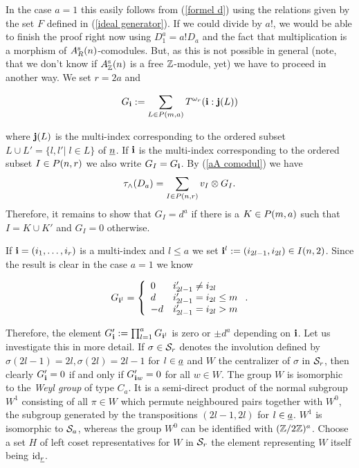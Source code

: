 \documentclass[twoside,12pt]{article}
\begin{document}
\begin{Pf}
In the case $a=1$ this easily follows from (\ref{formel d}) using the
relations given by the set $F$ defined in (\ref{ideal generator}). If we could divide by
$a!$, we would be able to finish the proof right now using
$D_1^a=a!D_a$ and the fact that multiplication is a morphism of
$A^{{\rm s}}_{R}(n)$-comodules. But, as this is not possible in general (note,
that we don't know if $A^{{\rm s}}_{{\mathbb Z}}(n)$ is a free ${\mathbb Z}$-module, yet)
we have to proceed in another way. We set $r=2a$ and

\[ G_{{\bf i}}:=\sum_{L\in P({m},{a})}T^{\omega_r}({\bf i}:{\bf j}(L))
\]

where ${\bf j}(L)$ is the multi-index corresponding to the ordered
subset $L\cup L'=\{l,l'|\; l\in L\}$ of $\underline{n}$. If ${\bf i}$ is the
multi-index corresponding to the ordered subset $I\in P({n},{r})$ we also
write $G_I=G_{{\bf i}}$. By (\ref{aA comodul})
we have
\[ \tau_{\wedge}(D_a)=\sum_{I\in P({n},{r})}v_{I}\otimes G_I. \]
Therefore, it remains to show that $G_I=d^a$ if there is a $K\in P({m},{a})$
such that $I=K\cup K'$ and $G_I=0$ otherwise.\Ab

If ${\bf i}=(i_1,\ldots , i_r)$ is a
multi-index and $l\leq a$ we set ${\bf i}^l:=(i_{2l-1},i_{2l})\in
I(n,2)$. Since the result is clear in the case $a=1$ we know

\[
G_{{\bf i}^l}=\left\{\begin{array}{ll}
0 & i_{2l-1}'\neq i_{2l} \\
d &  i_{2l-1}'= i_{2l}\leq m\\
-d &  i_{2l-1}'= i_{2l}> m
\end{array} \right. .
\]

Therefore, the element $G_{{\bf i}}':=\prod_{l=1}^a G_{{\bf i}^l}$ is zero
or $\pm d^a$ depending on ${\bf i}$. Let us investigate this in more
detail. If $\sigma\in {\cal S}_{r}$ denotes the involution defined by
$\sigma (2l-1)=2l, \sigma(2l)=2l-1$ for $l\in \underline{a}$ and $W$ the
centralizer of $\sigma$ in ${\cal S}_{r}$, then clearly $G_{{\bf i}}'=0$
if and only if $G_{{\bf i}w}'=0$ for all $w \in W$. The group $W$
is isomorphic to the {\em Weyl group} of type $C_a$. It is
a semi-direct product of the normal subgroup $W^1$ consisting of all
$\pi \in W$ which permute neighboured pairs together 
with $W^0$, the
subgroup generated by the transpositions $(2l-1,2l)$ for $l\in \underline{a}$.
$W^1$ is isomorphic to ${\cal S}_{a}$, whereas the group $W^0$ can be
identified with $({\mathbb Z}/2{\mathbb Z})^a$. Choose a set $H$ of left coset
representatives for $W$ in ${\cal S}_{r}$ the element representing $W$
itself being ${\rm id}_{\underline{r}}$.\\


\end{Pf}
\end{document}

